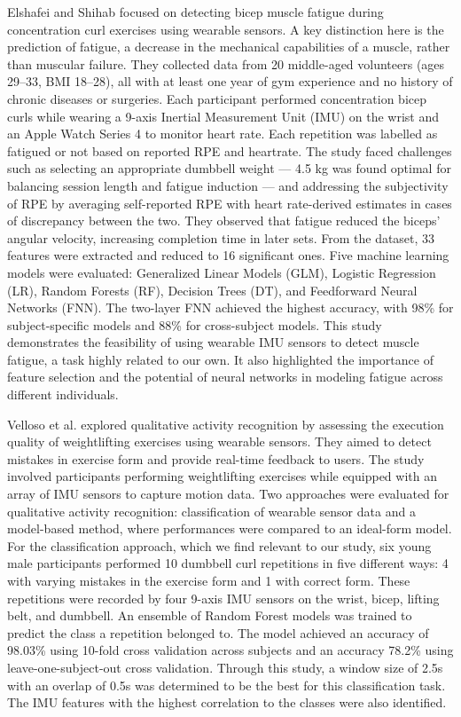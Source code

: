 \documentclass[conference]{IEEEtran}
\begin{document}
Elshafei and Shihab \cite{elshafei2021towards} focused on detecting bicep muscle fatigue during concentration curl exercises using wearable sensors. A key distinction here is the prediction of fatigue, a decrease in the mechanical capabilities of a muscle, rather than muscular failure. They collected data from 20 middle-aged volunteers (ages 29--33, BMI 18--28), all with at least one year of gym experience and no history of chronic diseases or surgeries. Each participant performed concentration bicep curls while wearing a 9-axis Inertial Measurement Unit (IMU) on the wrist and an Apple Watch Series 4 to monitor heart rate. Each repetition was labelled as fatigued or not based on reported RPE and heartrate. The study faced challenges such as selecting an appropriate dumbbell weight — 4.5 kg was found optimal for balancing session length and fatigue induction — and addressing the subjectivity of RPE by averaging self-reported RPE with heart rate-derived estimates in cases of discrepancy between the two. They observed that fatigue reduced the biceps' angular velocity, increasing completion time in later sets. From the dataset, 33 features were extracted and reduced to 16 significant ones. Five machine learning models were evaluated: Generalized Linear Models (GLM), Logistic Regression (LR), Random Forests (RF), Decision Trees (DT), and Feedforward Neural Networks (FNN). The two-layer FNN achieved the highest accuracy, with 98\% for subject-specific models and 88\% for cross-subject models. This study demonstrates the feasibility of using wearable IMU sensors to detect muscle fatigue, a task highly related to our own. It also highlighted the importance of feature selection and the potential of neural networks in modeling fatigue across different individuals. 

Velloso et al. \cite{velloso2013qualitative} explored qualitative activity recognition by assessing the execution quality of weightlifting exercises using wearable sensors. They aimed to detect mistakes in exercise form and provide real-time feedback to users. The study involved participants performing weightlifting exercises while equipped with an array of IMU sensors to capture motion data. Two approaches were evaluated for qualitative activity recognition: classification of wearable sensor data and a model-based method, where performances were compared to an ideal-form model. For the classification approach, which we find relevant to our study, six young male participants performed 10 dumbbell curl repetitions in five different ways: 4 with varying mistakes in the exercise form and 1 with correct form. These repetitions were recorded by four 9-axis IMU sensors on the wrist, bicep, lifting belt, and dumbbell. An ensemble of Random Forest models was trained to predict the class a repetition belonged to. The model achieved an accuracy of 98.03\% using 10-fold cross validation across subjects and an accuracy 78.2\% using leave-one-subject-out cross validation. Through this study, a window size of 2.5s with an overlap of 0.5s was determined to be the best for this classification task. The IMU features with the highest correlation to the classes were also identified.
\end{document}
